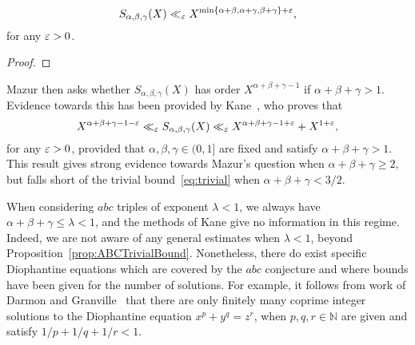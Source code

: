 \begin{lemma}\label{lem:TrivialBdforS}
\begin{equation}\label{eq:trivial}
 S_{\alpha,\beta,\gamma}(X)\ll_\varepsilon X^{\min\{\alpha+\beta , \alpha+\gamma , \beta+\gamma\}+\varepsilon},
\end{equation}
for any $\varepsilon>0$.
\end{lemma}
\begin{proof}
\end{proof}


Mazur then asks whether
 $S_{\alpha,\beta,\gamma}(X)$ has order $X^{\alpha+\beta+\gamma-1}$
if $\alpha+\beta+\gamma>1$.
Evidence towards this has been provided by Kane~\cite[Theorems~1 and 2]{kane}, who proves that
\[
X^{\alpha+\beta+\gamma-1-\varepsilon}\ll_\varepsilon
S_{\alpha,\beta,\gamma}(X)\ll_\varepsilon
X^{\alpha+\beta+\gamma-1+\varepsilon}+X^{1+\varepsilon},
\]
for any $\varepsilon>0$,
provided that $\alpha,\beta,\gamma\in (0,1]$ are fixed and satisfy $\alpha+\beta+\gamma>1$.
This result gives strong evidence towards Mazur's question when
$\alpha+\beta+\gamma\geq 2$, but falls short of the trivial bound~\eqref{eq:trivial}
when $\alpha+\beta+\gamma<3/2$.


When considering $abc$ triples of exponent $\lambda<1$, we always have $\alpha+\beta+\gamma\leq \lambda< 1$, and the methods of Kane give no information
in this regime. Indeed, we are not aware of any general estimates when $\lambda<1$,
 beyond Proposition~\ref{prop:ABCTrivialBound}. Nonetheless, there do exist specific Diophantine equations which are covered by the $abc$ conjecture and where bounds have been given for the number of solutions.
For example, it follows from work of Darmon and
Granville~\cite{DG} that there are only finitely many coprime integer solutions to the Diophantine equation $x^p+y^q=z^r$, when $p,q,r\in \mathbb{N}$ are given and satisfy $1/p+1/q+1/r<1$.


